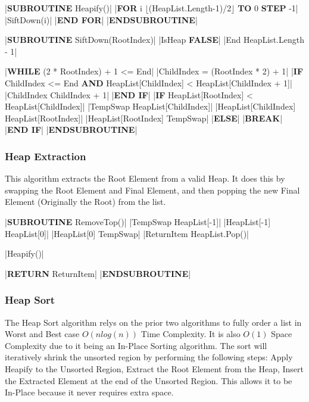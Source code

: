 \begin{flushleft}
                \begin{pseudocode} 
|\textbf{SUBROUTINE} Heapify()|
    |\textbf{FOR} i \leftarrow $\lfloor$(HeapList.Length-1)/2$\rfloor$ \textbf{TO} 0 \textbf{STEP} -1|
        |SiftDown(i)|
    |\textbf{END FOR}|
|\textbf{ENDSUBROUTINE}| 

|\textbf{SUBROUTINE} SiftDown(RootIndex)|
    |IsHeap \leftarrow \textbf{FALSE}|
    |End \leftarrow HeapList.Length - 1|

    |\textbf{WHILE} (2 * RootIndex) + 1 <= End|
        |ChildIndex = (RootIndex * 2) + 1|
        |\textbf{IF} ChildIndex <= End \textbf{AND} HeapList[ChildIndex] < HeapList[ChildIndex + 1]|
            |ChildIndex \leftarrow ChildIndex + 1|
        |\textbf{END IF}|
        |\textbf{IF} HeapList[RootIndex] < HeapList[ChildIndex]|
            |TempSwap \leftarrow HeapList[ChildIndex]|
            |HeapList[ChildIndex] \leftarrow HeapList[RootIndex]|
            |HeapList[RootIndex] \leftarrow TempSwap|
        |\textbf{ELSE}|   
            |\textbf{BREAK}|
        |\textbf{END IF}|
|\textbf{ENDSUBROUTINE}| 
                \end{pseudocode}

                \vspace{0.5cm}
            \subsubsection{Heap Extraction}
                This algorithm extracts the Root Element from a valid Heap. It does this by swapping the Root Element and Final Element, and then
                popping the new Final Element (Originally the Root) from the list. 
                \vspace{0.2cm}

                \begin{pseudocode}
|\textbf{SUBROUTINE} RemoveTop()|
    |TempSwap \leftarrow HeapList[-1]|
    |HeapList[-1] \leftarrow HeapList[0]|
    |HeapList[0] \leftarrow TempSwap|
    |ReturnItem \leftarrow HeapList.Pop()|

    |Heapify()|

    |\textbf{RETURN} ReturnItem|
|\textbf{ENDSUBROUTINE}| 
                \end{pseudocode}

                \vspace{0.5cm}
            \subsubsection{Heap Sort}
                The Heap Sort algorithm relys on the prior two algorithms to fully order a list in Worst and Best case $O(nlog(n))$ Time Complexity. It 
                is also $O(1)$ Space Complexity due to it being an In-Place Sorting algorithm. The sort will iteratively shrink the unsorted region by 
                performing the following steps: Apply Heapify to the Unsorted Region, Extract the Root Element from the Heap, Insert the Extracted Element 
                at the end of the Unsorted Region. This allows it to be In-Place because it never requires extra space.
                \vspace{0.2cm}


\end{flushleft}
